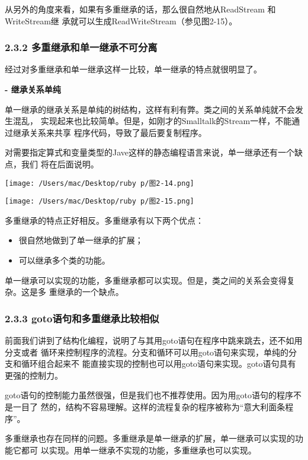 \documentclass[11pt]{ctexart}
\begin{document}
从另外的角度来看，如果有多重继承的话，那么很自然地从ReadStream 和 WriteStream继
承就可以生成ReadWriteStream（参见图2-15）。
\subsubsection{2.3.2 多重继承和单一继承不可分离}
\label{sec:org40f5950}

经过对多重继承和单一继承这样一比较，单一继承的特点就很明显了。

\textbf{- 继承关系单纯}

单一继承的继承关系是单纯的树结构，这样有利有弊。类之间的关系单纯就不会发生混乱，
实现起来也比较简单。但是，如刚才的Smalltalk的Stream一样，不能通过继承关系来共享
程序代码，导致了最后要复制程序。

对需要指定算式和变量类型的Jave这样的静态编程语言来说，单一继承还有一个缺点，我们
将在后面说明。
\begin{center}
\texttt{[image: /Users/mac/Desktop/ruby p/图2-14.png]}
\end{center}
\begin{center}
\texttt{[image: /Users/mac/Desktop/ruby p/图2-15.png]}
\end{center}

多重继承的特点正好相反。多重继承有以下两个优点：

\begin{itemize}
\item 很自然地做到了单一继承的扩展；
\item 可以继承多个类的功能。
\end{itemize}

单一继承可以实现的功能，多重继承都可以实现。但是，类之间的关系会变得复杂。这是多
重继承的一个缺点。
\subsubsection{2.3.3 goto语句和多重继承比较相似}
\label{sec:orgc953d8b}

前面我们讲到了结构化编程，说明了与其用goto语句在程序中跳来跳去，还不如用分支或者
循环来控制程序的流程。分支和循环可以用goto语句来实现，单纯的分支和循环组合起来不
能直接实现的控制也可以用goto语句来实现。goto语句具有更强的控制力。

goto语句的控制能力虽然很强，但是我们也不推荐使用。因为用goto语句的程序不是一目了
然的，结构不容易理解。这样的流程复杂的程序被称为“意大利面条程序”。

多重继承也存在同样的问题。多重继承是单一继承的扩展，单一继承可以实现的功能它都可
以实现。用单一继承不实现的功能，多重继承也可以实现。
\end{document}
